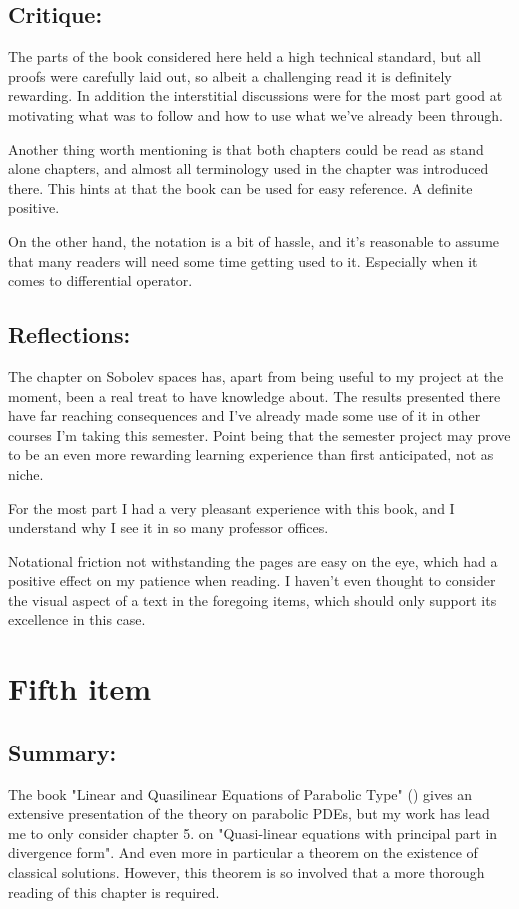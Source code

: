 \documentclass[11pt, a4paper]{article}
\begin{document}
\subsection{Critique:}
The parts of the book considered here held a high technical standard, but all proofs were carefully laid out, so albeit a challenging read it is definitely rewarding. In addition the interstitial discussions were for the most part good at motivating what was to follow and how to use what we've already been through. 

Another thing worth mentioning is that both chapters could be read as stand alone chapters, and almost all terminology used in the chapter was introduced there. This hints at that the book can be used for easy reference. A definite positive.

On the other hand, the notation is a bit of hassle, and it's reasonable to assume that many readers will need some time getting used to it. Especially when it comes to differential operator.

\subsection{Reflections:}
The chapter on Sobolev spaces has, apart from being useful to my project at the moment, been a real treat to have knowledge about. The results presented there have far reaching consequences and I've already made some use of it in other courses I'm taking this semester. Point being that the semester project may prove to be an even more rewarding learning experience than first anticipated, not as niche.

For the most part I had a very pleasant experience with this book, and I understand why I see it in so many professor offices. 

Notational friction not withstanding the pages are easy on the eye, which had a positive effect on my patience when reading. I haven't even thought to consider the visual aspect of a text in the  foregoing items, which should only support its excellence in this case.

\section{Fifth item}
\subsection{Summary:}
The book "Linear and Quasilinear Equations of Parabolic Type" (\cite{ladyzhenskaya}) gives an extensive presentation of the theory on parabolic PDEs, but my work has lead me to only consider chapter 5. on "Quasi-linear equations with principal part in divergence form". And even more in particular a theorem on the existence of classical solutions. However, this theorem is so involved that a more thorough reading of this chapter is required.
\end{document}
